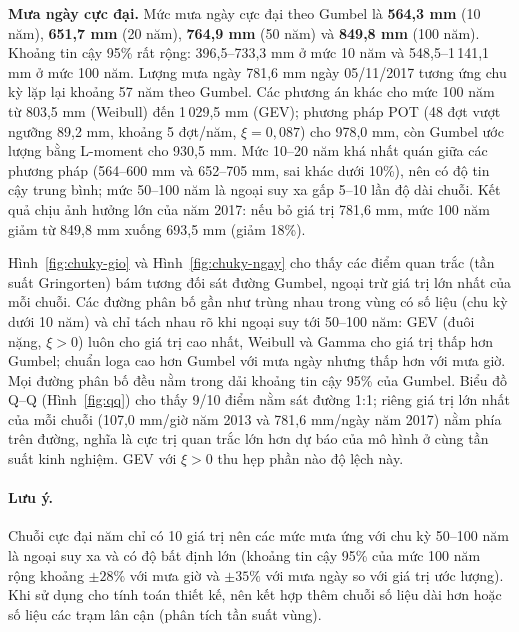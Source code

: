 \textbf{Mưa ngày cực đại.} Mức mưa ngày cực đại theo Gumbel là \textbf{564,3 mm} (10 năm), \textbf{651,7 mm} (20 năm), \textbf{764,9 mm} (50 năm) và \textbf{849,8 mm} (100 năm). Khoảng tin cậy 95\% rất rộng: 396,5--733,3 mm ở mức 10 năm và 548,5--1\,141,1 mm ở mức 100 năm. Lượng mưa ngày 781,6 mm ngày 05/11/2017 tương ứng chu kỳ lặp lại khoảng 57 năm theo Gumbel. Các phương án khác cho mức 100 năm từ 803,5 mm (Weibull) đến 1\,029,5 mm (GEV); phương pháp POT (48 đợt vượt ngưỡng 89,2 mm, khoảng 5 đợt/năm, $\xi = 0{,}087$) cho 978,0 mm, còn Gumbel ước lượng bằng L-moment cho 930,5 mm. Mức 10--20 năm khá nhất quán giữa các phương pháp (564--600 mm và 652--705 mm, sai khác dưới 10\%), nên có độ tin cậy trung bình; mức 50--100 năm là ngoại suy xa gấp 5--10 lần độ dài chuỗi. Kết quả chịu ảnh hưởng lớn của năm 2017: nếu bỏ giá trị 781,6 mm, mức 100 năm giảm từ 849,8 mm xuống 693,5 mm (giảm 18\%).




Hình~\ref{fig:chuky-gio} và Hình~\ref{fig:chuky-ngay} cho thấy các điểm quan trắc (tần suất Gringorten) bám tương đối sát đường Gumbel, ngoại trừ giá trị lớn nhất của mỗi chuỗi. Các đường phân bố gần như trùng nhau trong vùng có số liệu (chu kỳ dưới 10 năm) và chỉ tách nhau rõ khi ngoại suy tới 50--100 năm: GEV (đuôi nặng, $\xi > 0$) luôn cho giá trị cao nhất, Weibull và Gamma cho giá trị thấp hơn Gumbel; chuẩn loga cao hơn Gumbel với mưa ngày nhưng thấp hơn với mưa giờ. Mọi đường phân bố đều nằm trong dải khoảng tin cậy 95\% của Gumbel. Biểu đồ Q--Q (Hình~\ref{fig:qq}) cho thấy 9/10 điểm nằm sát đường 1:1; riêng giá trị lớn nhất của mỗi chuỗi (107,0 mm/giờ năm 2013 và 781,6 mm/ngày năm 2017) nằm phía trên đường, nghĩa là cực trị quan trắc lớn hơn dự báo của mô hình ở cùng tần suất kinh nghiệm. GEV với $\xi > 0$ thu hẹp phần nào độ lệch này.

\paragraph{Lưu ý.} Chuỗi cực đại năm chỉ có 10 giá trị nên các mức mưa ứng với chu kỳ 50--100 năm là ngoại suy xa và có độ bất định lớn (khoảng tin cậy 95\% của mức 100 năm rộng khoảng $\pm 28\%$ với mưa giờ và $\pm 35\%$ với mưa ngày so với giá trị ước lượng). Khi sử dụng cho tính toán thiết kế, nên kết hợp thêm chuỗi số liệu dài hơn hoặc số liệu các trạm lân cận (phân tích tần suất vùng).
